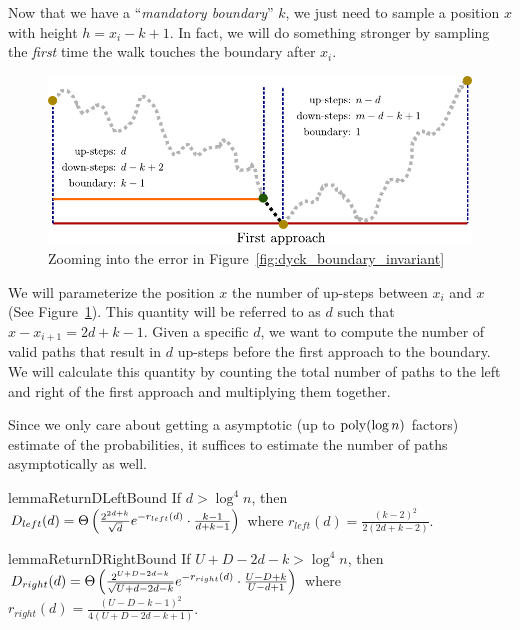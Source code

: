 Now that we have a ``\emph{mandatory boundary}'' $k$, we just need to sample a position $x$ with height $h = x_i-k+1$.
In fact, we will do something stronger by sampling the \emph{first} time the walk touches the boundary after $x_i$.
\begin{figure}[htpb]
    \centering
    \includegraphics[width=\textwidth]{images/dyck_first_approach_sampling.pdf}
    \caption{Zooming into the error in Figure~\ref{fig:dyck_boundary_invariant}}
    \label{fig:dyck_first_approach_sampling}
\end{figure}

We will parameterize the position $x$ the number of up-steps between $x_i$ and $x$
(See Figure~\ref{fig:dyck_first_approach_sampling}).
This quantity will be referred to as $d$ such that $x - x_{i+1} = 2d + k-1$.
Given a specific $d$, we want to compute the number of valid paths that result in
$d$ up-steps before the first approach to the boundary.
We will calculate this quantity by counting the total number of paths to the left and right
of the first approach and multiplying them together.

Since we only care about getting a asymptotic (up to $\mathrm{poly}(\log n)$ factors) estimate of the probabilities,
it suffices to estimate the number of paths asymptotically as well.

\begin{restatable}{lemma}{ReturnDLeftBound}
\label{lem:ReturnDLeftBound}
If $d > \log^4 n$, then $D_{left}(d)
= \Theta\left( \frac{2^{2d+k}}{\sqrt{d}}\mathlarger e^{-r_{left}(d)}\cdot \frac{k-1}{d+k-1}\right)$
where $r_{left}(d) = \frac{(k-2)^2}{2(2d+k-2)}$.
\end{restatable}

\begin{restatable}{lemma}{ReturnDRightBound}
\label{lem:ReturnDRightBound}
If $U+D-2d-k > \log^4 n$, then $D_{right}(d)
= \Theta\left( \frac{2^{U+D-2d-k}}{\sqrt{U+d-2d-k}}\mathlarger e^{-r_{right}(d)}\cdot \frac{U-D+k}{U-d+1}\right)$
where $r_{right}(d) = \frac{(U-D-k-1)^2}{4(U+D-2d-k+1)}$.
\end{restatable}



